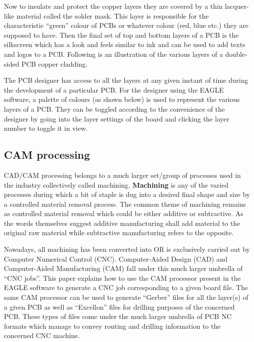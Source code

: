 Now to insulate and protect the copper layers they are covered by a thin lacquer-like material called the solder mask. This layer is responsible for the characteristic “green” colour of PCBs or whatever colour (red, blue etc.) they are supposed to have. Then the final set of top and bottom layers of a PCB is the silkscreen which has a look and feels similar to ink and can be used to add texts and logos to a PCB. Following is an illustration of the various layers of a double-sided PCB copper cladding. \par



The PCB designer has access to all the layers at any given instant of time during the development of a particular PCB. For the designer using the EAGLE software, a palette of colours (as shown below) is used to represent the various layers of a PCB. They can be toggled according to the convenience of the designer by going into the layer settings of the board and clicking the layer number to toggle it in view.

\subsection{CAM processing}

CAD/CAM processing belongs to a much larger set/group of processes used in the industry collectively called machining. \textbf{Machining} is any of the varied processes during which a bit of staple is dug into a desired final shape and size by a controlled material removal process. The common theme of machining remains as controlled material removal which could be either additive or subtractive. As the words themselves suggest additive manufacturing shall add material to the original raw material while subtractive manufacturing refers to the opposite.  \par

Nowadays, all machining has been converted into OR is exclusively carried out by Computer Numerical Control (CNC). Computer-Aided Design (CAD) and Computer-Aided Manufacturing (CAM) fall under this much larger umbrella of  “CNC jobs”. This paper explains how to use the CAM processor present in the EAGLE software to generate a CNC job corresponding to a given board file. The same CAM processor can be used to generate  “Gerber” files for all the layer(s) of a given PCB as well as “Excellon” files for drilling purposes of the concerned  PCB. These types of files come under the much larger umbrella of PCB NC formats which manage to convey routing and drilling information to the concerned CNC machine. \par

